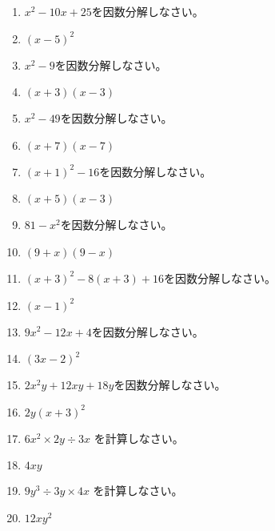 \documentclass[uplatex,a4j,11pt]{jsreport}
\begin{document}
\begin{multicols}{2}
\begin{enumerate}
    \item $x^2-10x+25$を因数分解しなさい。%
    \item $(x-5)^2$
    \item $x^2-9$を因数分解しなさい。%
    \item $(x+3)(x-3)$
    \item $x^2-49$を因数分解しなさい。%
    \item $(x+7)(x-7)$
    \item $(x+1)^2-16$を因数分解しなさい。%
    \item $(x+5)(x-3)$
    \item $81-x^2$を因数分解しなさい。%
    \item $(9+x)(9-x)$
    \item $(x+3)^2-8(x+3)+16$を因数分解しなさい。%
    \item $(x-1)^2$
    \item $9x^2-12x+4$を因数分解しなさい。%
    \item $(3x-2)^2$
    \item $2x^2y+12xy+18y$を因数分解しなさい。%
    \item $2y(x+3)^2$
    \item $6x^2\times 2y\div 3x$ を計算しなさい。%
    \item $4xy$
    \item $9y^3\div 3y\times 4x$ を計算しなさい。%
    \item $12xy^2$



  \end{enumerate}
\newpage
\end{multicols}
\end{document}

